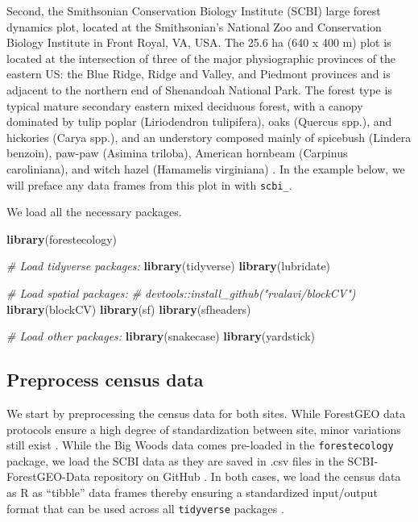 \documentclass[12pt]{article}
\newenvironment{Shaded}{\begin{snugshade}}{\end{snugshade}}
\newcommand{\CommentTok}[1]{\textcolor[rgb]{0.56,0.35,0.01}{\textit{#1}}}
\newcommand{\KeywordTok}[1]{\textcolor[rgb]{0.13,0.29,0.53}{\textbf{#1}}}
\newcommand{\NormalTok}[1]{#1}
\begin{document}
Second, the Smithsonian Conservation Biology Institute (SCBI) large
forest dynamics plot, located at the Smithsonian's National Zoo and
Conservation Biology Institute in Front Royal, VA, USA. The 25.6 ha (640
x 400 m) plot is located at the intersection of three of the major
physiographic provinces of the eastern US: the Blue Ridge, Ridge and
Valley, and Piedmont provinces and is adjacent to the northern end of
Shenandoah National Park. The forest type is typical mature secondary
eastern mixed deciduous forest, with a canopy dominated by tulip poplar
(Liriodendron tulipifera), oaks (Quercus spp.), and hickories (Carya
spp.), and an understory composed mainly of spicebush (Lindera benzoin),
paw-paw (Asimina triloba), American hornbeam (Carpinus caroliniana), and
witch hazel (Hamamelis virginiana) \citet{bourg_initial_2013}. In the
example below, we will preface any data frames from this plot in with
\texttt{scbi\_}.

We load all the necessary packages.

\begin{Shaded}
\begin{Highlighting}[]
\KeywordTok{library}\NormalTok{(forestecology)}

\CommentTok{# Load tidyverse packages:}
\KeywordTok{library}\NormalTok{(tidyverse)}
\KeywordTok{library}\NormalTok{(lubridate)}

\CommentTok{# Load spatial packages:}
\CommentTok{# devtools::install_github("rvalavi/blockCV")}
\KeywordTok{library}\NormalTok{(blockCV)}
\KeywordTok{library}\NormalTok{(sf)}
\KeywordTok{library}\NormalTok{(sfheaders)}

\CommentTok{# Load other packages:}
\KeywordTok{library}\NormalTok{(snakecase)}
\KeywordTok{library}\NormalTok{(yardstick)}
\end{Highlighting}
\end{Shaded}

\hypertarget{preprocess-census-data}{%
\subsection{Preprocess census data}\label{preprocess-census-data}}

We start by preprocessing the census data for both sites. While
ForestGEO data protocols ensure a high degree of standardization between
site, minor variations still exist
\citet{andersonteixeira_ctfs-forestgeo_2015}. While the Big Woods data
comes pre-loaded in the \texttt{forestecology} package, we load the SCBI
data as they are saved in .csv files in the SCBI-ForestGEO-Data
repository on GitHub
\citet{gonzalez-akre_scbi-forestgeoscbi-forestgeo-data_2020}. In both
cases, we load the census data as R as ``tibble'' data frames thereby
ensuring a standardized input/output format that can be used across all
\texttt{tidyverse} packages \citet{wickham_welcome_2019}.
\end{document}
